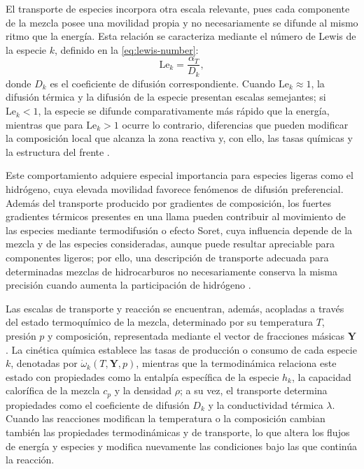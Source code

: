 \documentclass[12pt,a4paper,twoside,openany]{book}
\newcommand{\vect}[1]{\bm{#1}}
\begin{document}
El transporte de especies incorpora otra escala relevante, pues cada componente
de la mezcla posee una movilidad propia y no necesariamente se difunde al mismo
ritmo que la energía. Esta relación se caracteriza mediante el número de Lewis
de la especie \(k\), definido en la \cref{eq:lewis-number}:
\begin{equation}
  \mathrm{Le}_k=
  \frac{\alpha_T}{D_k},
  \label{eq:lewis-number}
\end{equation}
donde \(D_k\) es el coeficiente de difusión correspondiente. Cuando
\(\mathrm{Le}_k\approx1\), la difusión térmica y la difusión de la especie
presentan escalas semejantes; si \(\mathrm{Le}_k<1\), la especie se difunde
comparativamente más rápido que la energía, mientras que para
\(\mathrm{Le}_k>1\) ocurre lo contrario, diferencias que pueden modificar la
composición local que alcanza la zona reactiva y, con ello, las tasas químicas
y la estructura del frente \cite{Poinsot2005}.

Este comportamiento adquiere especial importancia para especies ligeras como el
hidrógeno, cuya elevada movilidad favorece fenómenos de difusión preferencial.
Además del transporte producido por gradientes de composición, los fuertes
gradientes térmicos presentes en una llama pueden contribuir al movimiento de
las especies mediante termodifusión o efecto Soret, cuya influencia depende de
la mezcla y de las especies consideradas, aunque puede resultar apreciable para
componentes ligeros; por ello, una descripción de transporte adecuada para
determinadas mezclas de hidrocarburos no necesariamente conserva la misma
precisión cuando aumenta la participación de hidrógeno
\cite{Poinsot2005}.

Las escalas de transporte y reacción se encuentran, además, acopladas a través
del estado termoquímico de la mezcla, determinado por su temperatura \(T\),
presión \(p\) y composición, representada mediante el vector de fracciones
másicas \(\vect Y\). La cinética química establece las tasas de producción o
consumo de cada especie \(k\), denotadas por
\(\dot{\omega}_k(T,\vect Y,p)\), mientras que la termodinámica relaciona este
estado con propiedades como la entalpía específica de la especie \(h_k\), la
capacidad calorífica de la mezcla \(c_p\) y la densidad \(\rho\); a su vez, el
transporte determina propiedades como el coeficiente de difusión \(D_k\) y la
conductividad térmica \(\lambda\). Cuando las reacciones modifican la
temperatura o la composición cambian también las propiedades termodinámicas y
de transporte, lo que altera los flujos de energía y especies y modifica
nuevamente las condiciones bajo las que continúa la reacción.
\end{document}
